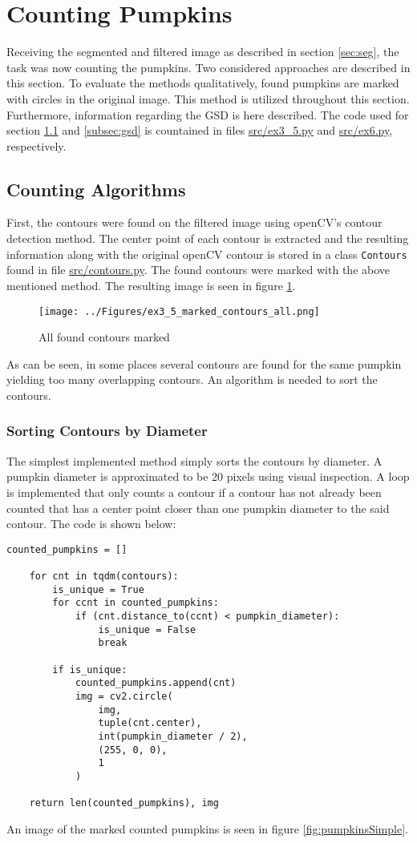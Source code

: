 \documentclass[../Head/Main.tex]{subfiles}
\begin{document}
\section{Counting Pumpkins}\label{sec:counting}
Receiving the segmented and filtered image as described in section \ref{sec:seg}, the task was now counting the pumpkins. Two considered approaches are described in this section. To evaluate the methods qualitatively, found pumpkins are marked with circles in the original image. This method is utilized throughout this section. Furthermore, information regarding the GSD is here described. The code used for section \ref{subsec:algorithms} and \ref{subsec:gsd} is countained in files \url{src/ex3_5.py} and \url{src/ex6.py}, respectively.

\subsection{Counting Algorithms}\label{subsec:algorithms}
First, the contours were found on the filtered image using openCV's contour detection method. The center point of each contour is extracted and the resulting information along with the original openCV contour is stored in a class \verb+Contours+ found in file \url{src/contours.py}. The found contours were marked with the above mentioned method. The resulting image is seen in figure \ref{fig:contours}.

\begin{figure}[H]
\centering
\texttt{[image: ../Figures/ex3\_5\_marked\_contours\_all.png]}
\caption{All found contours marked}
\label{fig:contours}
\end{figure}

As can be seen, in some places several contours are found for the same pumpkin yielding too many overlapping contours. An algorithm is needed to sort the contours.

\subsubsection{Sorting Contours by Diameter}
The simplest implemented method simply sorts the contours by diameter. A pumpkin diameter is approximated to be 20 pixels using visual inspection. A loop is implemented that only counts a contour if a contour has not already been counted that has a center point closer than one pumpkin diameter to the said contour. The code is shown below:
\begin{verbatim}
counted_pumpkins = []

    for cnt in tqdm(contours):
        is_unique = True
        for ccnt in counted_pumpkins:
            if (cnt.distance_to(ccnt) < pumpkin_diameter):
                is_unique = False
                break

        if is_unique:
            counted_pumpkins.append(cnt)
            img = cv2.circle(
                img, 
                tuple(cnt.center), 
                int(pumpkin_diameter / 2), 
                (255, 0, 0), 
                1
            )

    return len(counted_pumpkins), img
\end{verbatim}
An image of the marked counted pumpkins is seen in figure \ref{fig:pumpkinsSimple}.
\end{document}
